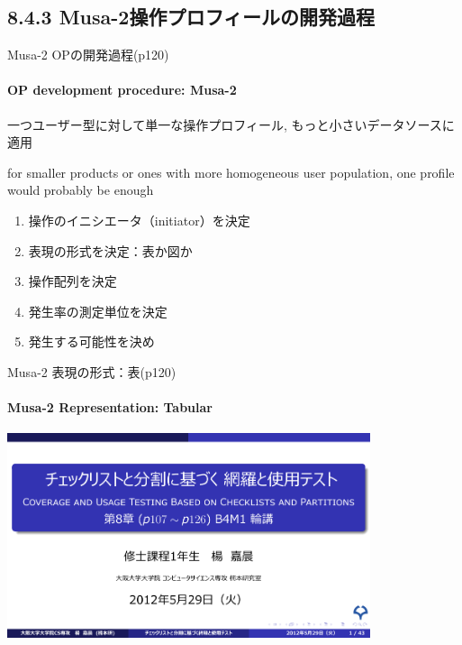 \subsection{8.4.3 Musa-2操作プロフィールの開発過程}
\begin{frame}[shrink=5]{Musa-2 OPの開発過程(p120)}
\framesubtitle{OP development procedure: Musa-2}
\begin{definationfc}[Musa-2]
一つユーザー型に対して単一な操作プロフィール, もっと小さいデータソースに適用

for smaller products or ones with more homogeneous user population, 
one profile would probably be enough
\end{definationfc}

\pause
\begin{enumerate}
\item 操作のイニシエータ（initiator）を決定
\item 表現の形式を決定：\alert<3->{表か図か}
\item 操作配列を決定
\item 発生率の測定単位を決定
\item 発生する可能性を決め
\end{enumerate}
\end{frame}
\begin{frame}{Musa-2 表現の形式：表(p120)}
\framesubtitle{Musa-2 Representation: Tabular}
\begin{center}
\includegraphics[width=0.8\textwidth,page=51]{figure/include.pdf}
\end{center}
\end{frame}
